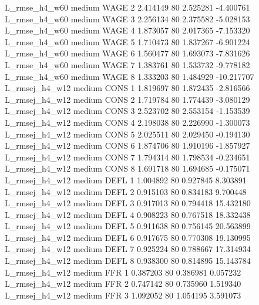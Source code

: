  L_rmse_h4_w60     medium     WAGE                 2  2.414149 80       2.525281          -4.400761
 L_rmse_h4_w60     medium     WAGE                 3  2.256134 80       2.375582          -5.028153
 L_rmse_h4_w60     medium     WAGE                 4  1.873057 80       2.017365          -7.153320
 L_rmse_h4_w60     medium     WAGE                 5  1.710473 80       1.837267          -6.901224
 L_rmse_h4_w60     medium     WAGE                 6  1.560477 80       1.693073          -7.831626
 L_rmse_h4_w60     medium     WAGE                 7  1.383761 80       1.533732          -9.778182
 L_rmse_h4_w60     medium     WAGE                 8  1.333203 80       1.484929         -10.217707
L_rmsej_h4_w12     medium     CONS                 1  1.819697 80       1.872435          -2.816566
L_rmsej_h4_w12     medium     CONS                 2  1.719784 80       1.774439          -3.080129
L_rmsej_h4_w12     medium     CONS                 3  2.523702 80       2.553154          -1.153539
L_rmsej_h4_w12     medium     CONS                 4  2.198038 80       2.226990          -1.300073
L_rmsej_h4_w12     medium     CONS                 5  2.025511 80       2.029450          -0.194130
L_rmsej_h4_w12     medium     CONS                 6  1.874706 80       1.910196          -1.857927
L_rmsej_h4_w12     medium     CONS                 7  1.794314 80       1.798534          -0.234651
L_rmsej_h4_w12     medium     CONS                 8  1.691718 80       1.694685          -0.175071
L_rmsej_h4_w12     medium     DEFL                 1  1.004892 80       0.927845           8.303891
L_rmsej_h4_w12     medium     DEFL                 2  0.915103 80       0.834183           9.700448
L_rmsej_h4_w12     medium     DEFL                 3  0.917013 80       0.794418          15.432180
L_rmsej_h4_w12     medium     DEFL                 4  0.908223 80       0.767518          18.332438
L_rmsej_h4_w12     medium     DEFL                 5  0.911638 80       0.756145          20.563899
L_rmsej_h4_w12     medium     DEFL                 6  0.917675 80       0.770308          19.130995
L_rmsej_h4_w12     medium     DEFL                 7  0.925224 80       0.788667          17.314934
L_rmsej_h4_w12     medium     DEFL                 8  0.938300 80       0.814895          15.143784
L_rmsej_h4_w12     medium      FFR                 1  0.387203 80       0.386981           0.057232
L_rmsej_h4_w12     medium      FFR                 2  0.747142 80       0.735960           1.519340
L_rmsej_h4_w12     medium      FFR                 3  1.092052 80       1.054195           3.591073
